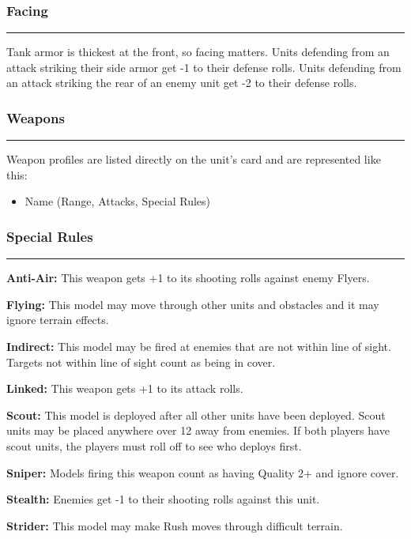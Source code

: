 \documentclass[11pt]{article}
\newcommand{\myheading}[1]{
  \subsubsection*{\centering #1}
  \raggedright
  \hrule
}
\renewenvironment{description}
  {\list{}{\labelwidth=0pt \leftmargin=0pt
   \let\makelabel\descriptionlabel}}
  {\endlist}
\newenvironment{mydescription}{
\begin{description}
  \setlength{\itemsep}{1pt}
  \setlength{\parskip}{0pt}
  \setlength{\parsep}{0pt}}{\end{description}
}
\begin{document}
\begin{multicols*}{3}[]
\begin{mydescription}
\end{mydescription}

\myheading{Facing}

Tank armor is thickest at the front, so facing matters. Units
defending from an attack striking their side armor get -1 to their
defense rolls. Units defending from an attack striking the rear of an
enemy unit get -2 to their defense rolls.

\myheading{Weapons}

Weapon profiles are listed directly on the unit’s card and are
represented like this:

\begin{itemize}

\item Name (Range, Attacks, Special Rules)

\end{itemize}

\columnbreak

\myheading{Special Rules}

\begin{mydescription}

\item{\bf Anti-Air:} This weapon gets +1 to its shooting rolls against
  enemy Flyers.

\item{\bf Flying:} This model may move through other units and
  obstacles and it may ignore terrain effects.

\item{\bf Indirect:} This model may be fired at enemies that are not
  within line of sight. Targets not within line of sight count as
  being in cover.

\item{\bf Linked:} This weapon gets +1 to its attack rolls.

\item{\bf Scout:} This model is deployed after all other units have
  been deployed. Scout units may be placed anywhere over 12 away from
  enemies. If both players have scout units, the players must roll off
  to see who deploys first.

\item{\bf Sniper:} Models firing this weapon count as having Quality
  2+ and ignore cover.

\item{\bf Stealth:} Enemies get -1 to their shooting rolls against
  this unit.

\item{\bf Strider:} This model may make Rush moves through difficult
  terrain.


\end{mydescription}
\end{multicols*}
\end{document}
